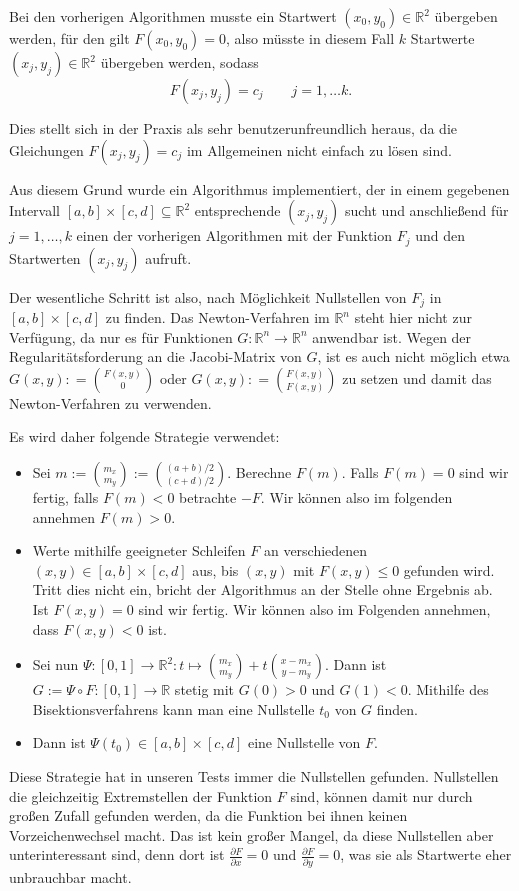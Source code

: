 \documentclass[a4paper,11pt,bibliography=totoc,listof=totoc,headinclude=true,cleardoublepage=empty,oneside]{scrartcl}
\newcommand{\R}{\mathbb{R}}
\renewcommand{\subset}{\subseteq}
\newcommand{\diff}[2]{\frac{\partial #1}{\partial #2}}
\begin{document}
Bei den vorherigen Algorithmen musste ein Startwert $(x_0,y_0) \in \R^2$ übergeben werden, für den gilt $F(x_0,y_0)=0$, also müsste in diesem Fall $k$ Startwerte $(x_j,y_j) \in \R^2$ übergeben werden, sodass
\[
F(x_j,y_j) = c_j \qquad j=1,\dots k.
\]

Dies stellt sich in der Praxis als sehr benutzerunfreundlich heraus, da die Gleichungen $F(x_j,y_j)=c_j$ im Allgemeinen nicht einfach zu lösen sind. 

Aus diesem Grund wurde ein Algorithmus implementiert, der in einem gegebenen Intervall $[a,b]\times[c,d] \subset \R^2$ entsprechende $(x_j,y_j)$ sucht und anschließend für $j=1,\dots, k$ einen der vorherigen Algorithmen mit der Funktion $F_j$ und den Startwerten $(x_j,y_j)$ aufruft. 

Der wesentliche Schritt ist also, nach Möglichkeit Nullstellen von $F_j$ in $[a,b] \times [c,d]$ zu finden. Das Newton-Verfahren im $\R^n$ steht hier nicht zur Verfügung, da nur es für Funktionen $G: \R^n \to \R^n$ anwendbar ist. Wegen der Regularitätsforderung  an die Jacobi-Matrix von $G$, ist es auch nicht möglich etwa $G(x,y) : = \binom{F(x,y)}{0}$ oder $G(x,y) : = \binom{F(x,y)}{F(x,y)}$ zu setzen und damit das Newton-Verfahren zu verwenden.

Es wird daher folgende Strategie verwendet:
\begin{itemize}
	\item Sei $m:= \binom{m_x}{m_y} := \binom{(a+b)/2}{(c+d)/2}$. Berechne $F(m)$. Falls $F(m)=0$ sind wir fertig, falls $F(m)<0$ betrachte $-F$. Wir können also im folgenden annehmen $F(m)>0$.
	\item Werte mithilfe geeigneter Schleifen $F$ an verschiedenen $(x,y) \in [a,b]\times [c,d]$ aus, bis $(x,y)$ mit $F(x,y)\le 0$ gefunden wird. Tritt dies nicht ein, bricht der Algorithmus an der Stelle ohne Ergebnis ab. Ist $F(x,y)=0$ sind wir fertig. Wir können also im Folgenden annehmen, dass $F(x,y)<0$ ist.
	\item Sei nun $\Psi : [0,1] \to \R^2 : t \mapsto \binom{m_x}{m_y} + t \binom{x-m_x}{y-m_y}$. Dann ist $ G:= \Psi \circ F : [0,1] \to \R$ stetig mit $G(0)>0$ und $G(1)<0$. Mithilfe des Bisektionsverfahrens kann man eine Nullstelle $t_0$ von $G$ finden.
	\item Dann ist $\Psi(t_0) \in [a,b] \times [c,d]$ eine Nullstelle von $F$.
\end{itemize} 
Diese Strategie hat in unseren Tests immer die Nullstellen gefunden. Nullstellen die gleichzeitig Extremstellen der Funktion $F$ sind, können damit nur durch großen Zufall gefunden werden, da die Funktion bei ihnen keinen Vorzeichenwechsel macht. Das ist kein großer Mangel, da diese Nullstellen aber unterinteressant sind, denn dort ist $\diff{F}{x}=0$ und $\diff{F}{y}=0$, was sie als Startwerte eher unbrauchbar macht.
\end{document}

